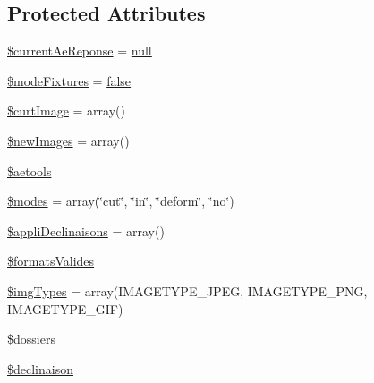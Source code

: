 \subsection*{Protected Attributes}
\begin{DoxyCompactItemize}
\item 
\hyperlink{class_acme_group_1_1services_1_1aetools_1_1image_aetools_a32a3bc01cb32d1ff577174cef04b6c14}{\$current\+Ae\+Reponse} = \hyperlink{validate_8js_afb8e110345c45e74478894341ab6b28e}{null}
\item 
\hyperlink{class_acme_group_1_1services_1_1aetools_1_1image_aetools_ad8ef5c6b230eda0015c29767557c3664}{\$mode\+Fixtures} = \hyperlink{validate_8js_a5df37b7f02e5cdc7d9412b7f872b8e01}{false}
\item 
\hyperlink{class_acme_group_1_1services_1_1aetools_1_1image_aetools_afea71bd56e07cddfbb082f539aafe8d5}{\$curt\+Image} = array()
\item 
\hyperlink{class_acme_group_1_1services_1_1aetools_1_1image_aetools_a92584c7cb5b0af46a6c0421f52982986}{\$new\+Images} = array()
\item 
\hyperlink{class_acme_group_1_1services_1_1aetools_1_1image_aetools_acb0d74532044a05968d8b01463fec572}{\$aetools}
\item 
\hyperlink{class_acme_group_1_1services_1_1aetools_1_1image_aetools_a1e89d8a2da5b8212e683826956a15c72}{\$modes} = array(\char`\"{}cut\char`\"{}, \char`\"{}in\char`\"{}, \char`\"{}deform\char`\"{}, \char`\"{}no\char`\"{})
\item 
\hyperlink{class_acme_group_1_1services_1_1aetools_1_1image_aetools_ab1f876c08c1ffead0c030dfa71ae1de7}{\$appli\+Declinaisons} = array()
\item 
\hyperlink{class_acme_group_1_1services_1_1aetools_1_1image_aetools_a52c0380da54306d10c3f2adb8db138aa}{\$formats\+Valides}
\item 
\hyperlink{class_acme_group_1_1services_1_1aetools_1_1image_aetools_a1182c4529a7659421a329660a4c2e020}{\$img\+Types} = array(I\+M\+A\+G\+E\+T\+Y\+P\+E\+\_\+\+J\+P\+E\+G, I\+M\+A\+G\+E\+T\+Y\+P\+E\+\_\+\+P\+N\+G, I\+M\+A\+G\+E\+T\+Y\+P\+E\+\_\+\+G\+I\+F)
\item 
\hyperlink{class_acme_group_1_1services_1_1aetools_1_1image_aetools_a71655767b04ef89ac599d3051bfdca1d}{\$dossiers}
\item 
\hyperlink{class_acme_group_1_1services_1_1aetools_1_1image_aetools_adf57141b741a9bc41c106fd2329d0d3a}{\$declinaison}
\end{DoxyCompactItemize}


